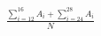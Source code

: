 \documentclass[preview]{standalone}
\begin{document}
\begin{align*}
\frac{\sum_{i= 12 }^{16} A_i + \sum_{i= 24 }^{28} A_i}{N}
\end{align*}
\end{document}

